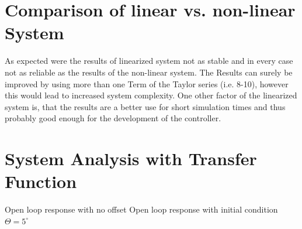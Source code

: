 \section{Comparison of linear vs. non-linear System}
\label{ssection:Comparison_lin_non_lin}
As expected were the results of linearized system not as stable and in every case not as reliable as the results of the non-linear system. The Results can surely be improved by using more than one Term of the Taylor series (i.e. 8-10), however this would lead to increased system complexity. One other factor of the linearized system is, that the results are a better use for short simulation times and thus probably good enough for the development of the controller. 

\section{System Analysis with Transfer Function}
Open loop response with no offset
Open loop response with initial condition $\Theta = 5^\circ$
\begin{align}\label{eq: 1}
        
    \end{align}

